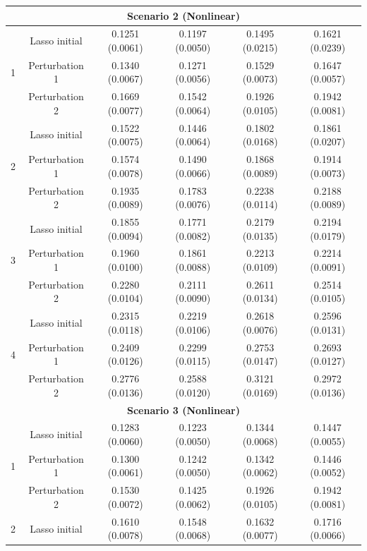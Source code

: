 \documentclass[12pt]{article}
\begin{document}
\begin{table}[!ht]
\begin{tabular}{cccccc}
        \hline
         \multicolumn{6}{c}{\textbf{Scenario 2 (Nonlinear)}}\\
        \hline
        \multirow{3}{*}{1} 
        & Lasso initial & 0.1251 (0.0061) &0.1197 (0.0050) &0.1495 (0.0215) &0.1621 (0.0239) \\ 
        & Perturbation 1 & 0.1340 (0.0067)  & 0.1271 (0.0056) & 0.1529 (0.0073) & 0.1647 (0.0057) \\ 
        & Perturbation 2  & 0.1669 (0.0077)& 0.1542 (0.0064)& 0.1926 (0.0105)  & 0.1942 (0.0081) \\
        \hline
        \multirow{3}{*}{2} 
        & Lasso initial & 0.1522 (0.0075) &0.1446 (0.0064) &0.1802 (0.0168) &0.1861 (0.0207) \\ 
        & Perturbation 1  & 0.1574 (0.0078) & 0.1490 (0.0066) & 0.1868 (0.0089) & 0.1914 (0.0073) \\ 
        & Perturbation 2 & 0.1935 (0.0089) & 0.1783 (0.0076) & 0.2238 (0.0114)  & 0.2188 (0.0089)  \\
        \hline
        \multirow{3}{*}{3} 
        & Lasso initial & 0.1855 (0.0094) &0.1771 (0.0082) &0.2179 (0.0135) &0.2194 (0.0179) \\ 
        & Perturbation 1  & 0.1960 (0.0100) & 0.1861 (0.0088) & 0.2213 (0.0109) & 0.2214 (0.0091) \\
        & Perturbation 2 & 0.2280 (0.0104) & 0.2111 (0.0090)& 0.2611 (0.0134) & 0.2514 (0.0105)  \\
        \hline
        \multirow{3}{*}{4} 
        & Lasso initial & 0.2315 (0.0118) &0.2219 (0.0106) &0.2618 (0.0076) &0.2596 (0.0131) \\ 
        & Perturbation 1  & 0.2409 (0.0126)  & 0.2299 (0.0115)& 0.2753 (0.0147) &0.2693 (0.0127)\\ 
        & Perturbation 2  & 0.2776 (0.0136) & 0.2588 (0.0120)& 0.3121 (0.0169) & 0.2972 (0.0136) \\
        \hline 
         \multicolumn{6}{c}{\textbf{Scenario 3 (Nonlinear)}}\\
        \hline
       \multirow{3}{*}{1} 
        & Lasso initial & 0.1283 (0.0060)& 0.1223 (0.0050) &0.1344 (0.0068) &0.1447 (0.0055) \\ 
        & Perturbation 1 & 0.1300 (0.0061) & 0.1242 (0.0050) & 0.1342 (0.0062) & 0.1446 (0.0052)\\ 
        & Perturbation 2 & 0.1530 (0.0072)  & 0.1425 (0.0062)& 0.1926 (0.0105) & 0.1942 (0.0081)  \\
        \hline
        \multirow{3}{*}{2} 
        & Lasso initial  & 0.1610 (0.0078) &0.1548 (0.0068) &0.1632 (0.0077) & 0.1716 (0.0066)\\ 

\end{tabular}
\end{table}
\end{document}
